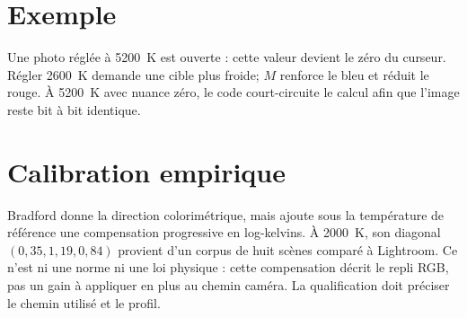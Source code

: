 \section{Exemple}
Une photo réglée à 5200~K est ouverte : cette valeur devient le zéro du curseur. Régler 2600~K demande une cible plus froide; $M$ renforce le bleu et réduit le rouge. À 5200~K avec nuance zéro, le code court-circuite le calcul afin que l'image reste bit à bit identique.

\section{Calibration empirique}
Bradford donne la direction colorimétrique, mais \IPR{} ajoute sous la température de référence une compensation progressive en log-kelvins. À 2000~K, son diagonal $(0{,}35,1{,}19,0{,}84)$ provient d'un corpus de huit scènes comparé à Lightroom. Ce n'est ni une norme ni une loi physique : cette compensation décrit le repli RGB, pas un gain à appliquer en plus au chemin caméra. La qualification doit préciser le chemin utilisé et le profil.



